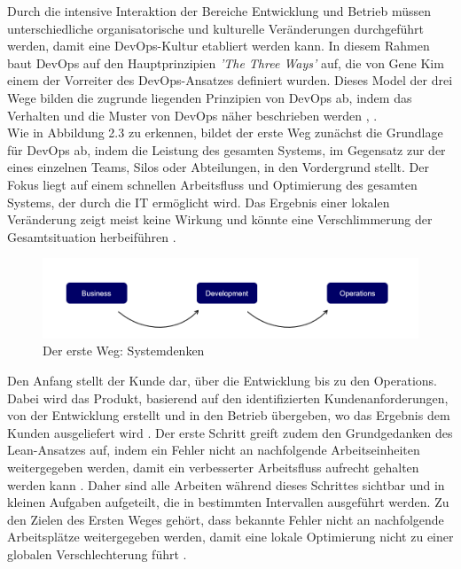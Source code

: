Durch die intensive Interaktion der Bereiche Entwicklung und Betrieb müssen unterschiedliche organisatorische und kulturelle Veränderungen durchgeführt werden, damit eine DevOps-Kultur etabliert werden kann. In diesem Rahmen baut DevOps auf den Hauptprinzipien \textit{'The Three Ways'} auf, die von Gene Kim einem der Vorreiter des DevOps-Ansatzes \cite{kim_devops-handbuch_2017} definiert wurden. Dieses Model der drei Wege bilden die zugrunde liegenden Prinzipien von DevOps ab, indem das Verhalten und die Muster von DevOps näher beschrieben werden \cite[S. 9 - 44]{kim_devops-handbuch_2017}, \cite{kim_three_2012}.\\ 

Wie in Abbildung 2.3 zu erkennen, bildet der erste Weg zunächst die Grundlage für DevOps ab, indem die Leistung des gesamten Systems, im Gegensatz zur der eines einzelnen Teams, Silos oder Abteilungen, in den Vordergrund stellt. Der Fokus liegt auf einem schnellen Arbeitsfluss und Optimierung des gesamten Systems, der durch die IT ermöglicht wird. Das Ergebnis einer lokalen Veränderung zeigt meist keine Wirkung und könnte eine Verschlimmerung der Gesamtsituation herbeiführen \cite[S. 252]{tiemeyer_handbuch_2021}. 

\begin{figure}[h]
    \centering
    \includegraphics[scale=0.5]{Bilder/First Way.png}
    \caption{Der erste Weg: Systemdenken \cite{kim_three_2012}}
\end{figure}

Den Anfang stellt der Kunde dar, über die Entwicklung bis zu den Operations. Dabei wird das Produkt, basierend auf den identifizierten Kundenanforderungen, von der Entwicklung erstellt und in den Betrieb übergeben, wo das Ergebnis dem Kunden ausgeliefert wird \cite[S. 12]{halstenberg_devops_2020}. Der erste Schritt greift zudem den Grundgedanken des Lean-Ansatzes auf, indem ein Fehler nicht an nachfolgende Arbeitseinheiten weitergegeben werden, damit ein verbesserter Arbeitsfluss aufrecht gehalten werden kann \cite[S. 252]{tiemeyer_handbuch_2021}. Daher sind alle Arbeiten während dieses Schrittes sichtbar und in kleinen Aufgaben aufgeteilt, die in bestimmten Intervallen ausgeführt werden. Zu den Zielen des Ersten Weges gehört, dass bekannte Fehler nicht an nachfolgende Arbeitsplätze weitergegeben werden, damit eine lokale Optimierung nicht zu einer globalen Verschlechterung führt \cite{kim_three_2012}.

